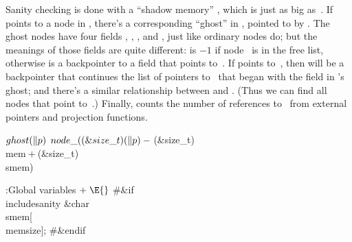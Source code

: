 Sanity checking is done with a ``shadow memory'' , which is just
as big as~. If  points to a node in , there's a
corresponding
``ghost'' in , pointed to by . The ghost
nodes have four
fields , , , and , just like
ordinary nodes do; but the
meanings of those fields are quite different:  is $-1$ if
node~
is in the free list, otherwise  is a backpointer to a
field
that points to~. If  points to~, then  will be
a backpointer that continues the list of pointers to~ that began
with the  field in 's ghost; and there's a similar
relationship
between  and . (Thus we can find all
nodes that point to~.)
Finally,  counts the number of references to~
from external
pointers and projection functions.

\Y\B\4\D$\\{ghost}(\|p)$ \5
$\\{node\_}((\&{size\_t})(\|p)-{}$(\&{size\_t}) \\{mem}${}+{}$(\&{size\_t}) %
\\{smem})\par
\Y\B\4:Global variables\X${}\mathrel+\E{}$\6
\8\#\&{if} \\{includesanity}\6
\&{char} \\{smem}[\\{memsize}];\6
\8\#\&{endif}\par
\fi


